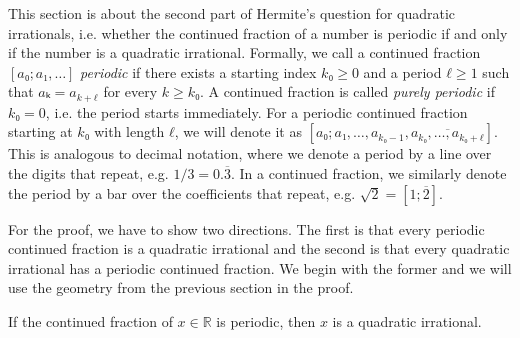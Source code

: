 This section is about the second part of Hermite's question for quadratic
irrationals, i.e. whether the continued fraction of a number is periodic if and only
if the number is a quadratic irrational.
Formally, we call a continued fraction $[a₀; a₁, …]$ \emph{periodic}
if there exists a starting index $k₀ ≥ 0$ and a period $ℓ ≥ 1$ such that $aₖ = a_{k+ℓ}$ for every $k ≥ k₀$.
A continued fraction is called \emph{purely periodic} if $k₀ = 0$,
i.e. the period starts immediately.
For a periodic continued fraction starting at $k₀$ with length $ℓ$,
we will denote it as $[a₀; a₁, …, a_{k₀-1}, \overline{a_{k₀}, …, a_{k₀+ℓ}}]$.
This is analogous to decimal notation, where we denote a period by a line over the digits that repeat,
e.g. $1/3 = 0.\overline{3}$.
In a continued fraction, we similarly denote the period by a bar over the
coefficients that repeat, e.g. $\sqrt{2} = [1; \overline{2}]$.

For the proof, we have to show two directions.
The first is that every periodic continued fraction is a quadratic irrational
and the second is that every quadratic irrational has a periodic continued fraction.
We begin with the former and we will use the geometry from the previous section
in the proof.

\begin{theorem}
  If the continued fraction of $x ∈ ℝ$ is periodic, then $x$ is a quadratic irrational.
\end{theorem}

